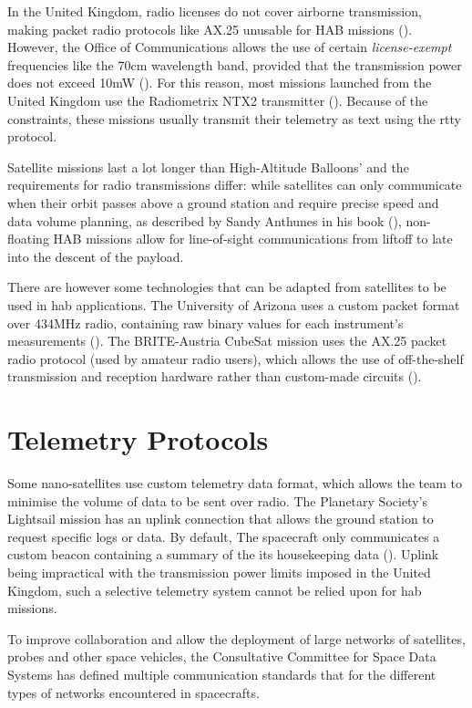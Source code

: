 In the United Kingdom, radio licenses do not cover airborne transmission, making
packet radio protocols like AX.25 unusable for HAB missions 
(\cite{ukhasradio2016}). However, the Office of Communications allows the use
of certain \textit{license-exempt} frequencies like the 70cm wavelength band,
provided that the transmission power does not exceed 10mW (\cite{Ofcom2014}).
For this reason, most missions launched from the United Kingdom use the
Radiometrix NTX2 transmitter (\cite{radiometrix2012}). Because of the
constraints, these missions usually transmit their telemetry as text using the
\acrfull{rtty} protocol.

Satellite missions last a lot longer than High-Altitude Balloons' and the
requirements for radio transmissions differ: while satellites can only
communicate when their orbit passes above a ground station and require precise
speed and data volume planning, as described by Sandy Anthunes in his book
(\cite{Antunes2015}), non-floating HAB missions allow for line-of-sight
communications from liftoff to late into the descent of the payload.

There are however some technologies that can be adapted from satellites to be
used in \acrshort{hab} applications. The University of Arizona uses a custom
packet format over 434MHz radio, containing raw binary values for each
instrument's measurements (\cite{Eatchel2002}). The BRITE-Austria CubeSat
mission uses the AX.25 packet radio protocol (used by amateur radio users),
which allows the use of off-the-shelf transmission and reception hardware
rather than custom-made circuits (\cite{Traussnig2007}).

\section{Telemetry Protocols}

Some nano-satellites use custom telemetry data format, which allows the team
to minimise the volume of data to be sent over radio. The Planetary Society's
Lightsail mission has an uplink connection that allows the ground station
to request specific logs or data. By default, The spacecraft only communicates
a custom beacon containing a summary of the its housekeeping data
(\cite{planetary2016}). Uplink being impractical with the transmission power
limits imposed in the United Kingdom, such a selective telemetry system cannot
be relied upon for \acrshort{hab} missions.

To improve collaboration and allow the deployment of large networks of
satellites, probes and other space vehicles, the Consultative Committee for
Space Data Systems has defined multiple communication standards that for
the different types of networks encountered in spacecrafts.

